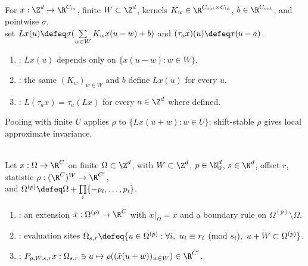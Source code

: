 \begin{definition} \label{def:sl-sparse-sharing-equivariance} \\
For $x:\Z^d\to\R^{C_{\rm in}}$, finite $W\subset\Z^d$, kernels $K_w\in\R^{C_{\rm out}\times C_{\rm in}}$, $b\in\R^{C_{\rm out}}$, and pointwise $\sigma$,\\
set $Lx(u)\defeq\sigma(\sum\limits_{w\in W}K_wx(u-w)+b)$ and $(\tau_a x)(u)\defeq x(u-a)$.
\begin{enumerate}[label=(\roman*)]
\setlength{\itemsep}{0pt}
\item {}: $Lx(u)$ depends only on $\{x(u-w):w\in W\}$.
\item {}: the same $(K_w)_{w\in W}$ and $b$ define $Lx(u)$ for every $u$.
\item {}: $L(\tau_a x)=\tau_a(Lx)$ for every $a\in\Z^d$ where defined.
\end{enumerate}
Pooling with finite $U$ applies $\rho$ to $\{Lx(u+w):w\in U\}$; shift-stable $\rho$ gives local approximate invariance.
\end{definition}

\begin{definition} \label{def:sl-pooling-padding-stride} \\
Let $x:\Omega\to\R^C$ on finite $\Omega\subset\Z^d$, with $W\subset\Z^d$, $p\in\N_0^d$, $s\in\N^d$, offset $r$, statistic $\rho:(\R^C)^W\to\R^{C'}$,\\
and $\Omega^{(p)}\defeq\Omega+\prod\limits_i\{-p_i,\ldots,p_i\}$.
\begin{enumerate}[label=(\roman*)]
\setlength{\itemsep}{0pt}
\item {}: an extension $\tilde x:\Omega^{(p)}\to\R^C$ with $\tilde x|_{\Omega}=x$ and a boundary rule on $\Omega^{(p)}\setminus\Omega$.
\item {}: evaluation sites $\Omega_{s,r}\defeq\{u\in\Omega^{(p)}:\forall i,\ u_i\equiv r_i\pmod{s_i},\ u+W\subset\Omega^{(p)}\}$.
\item {}: $P_{\rho,W,s,r}x:\Omega_{s,r}\ni u\mapsto\rho((\tilde x(u+w))_{w\in W})\in\R^{C'}$.
\end{enumerate}
\end{definition}

